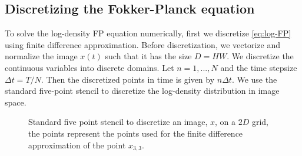 \documentclass[]{interact}
\theoremstyle{plain}%
\theoremstyle{definition}
\theoremstyle{remark}
\begin{document}
\subsection{Discretizing the Fokker-Planck equation}
To solve the log-density FP equation numerically, first we discretize \eqref{eq:log-FP} using finite difference approximation. Before discretization, we vectorize and normalize the image $x(t)$ such that it has the size $D = HW$. We discretize the continuous variables into discrete domains. Let $n = 1,..., N$ and the time stepsize  $\Delta t = T/N$. Then the discretized points in time is given by $n\Delta t$. We use the standard five-point stencil to discretize the log-density distribution in image space.
\begin{figure}[htbp]
    \centering
    \caption{Standard five point stencil to discretize an image, $x$, on a $2D$ grid, the points represent the points used for the finite difference approximation of the point $x_{3,3}$.}
    \label{fig:5-point}
\end{figure}
\end{document}
